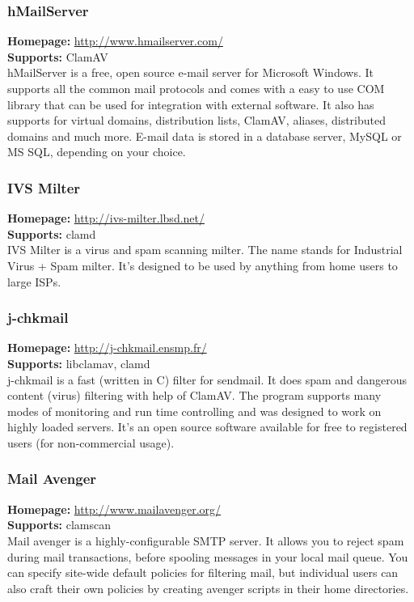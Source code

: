 \documentclass[a4paper,titlepage,12pt]{article}
\begin{document}
    \subsubsection{hMailServer}
    \textbf{Homepage:} \url{http://www.hmailserver.com/}\\
    \textbf{Supports:} ClamAV\\[4pt]
    hMailServer is a free, open source e-mail server for Microsoft Windows.
    It supports all the common mail protocols and comes with a easy to use COM
    library that can be used for integration with external software. It also
    has supports for virtual domains, distribution lists, ClamAV, aliases,
    distributed domains and much more. E-mail data is stored in a database
    server, MySQL or MS SQL, depending on your choice.

    \subsubsection{IVS Milter}
    \textbf{Homepage:} \url{http://ivs-milter.lbsd.net/}\\
    \textbf{Supports:} clamd\\[4pt]
    IVS Milter is a virus and spam scanning milter. The name stands for
    Industrial Virus + Spam milter. It's designed to be used by anything
    from home users to large ISPs.

    \subsubsection{j-chkmail}
    \textbf{Homepage:} \url{http://j-chkmail.ensmp.fr/}\\
    \textbf{Supports:} libclamav, clamd\\[4pt]
    j-chkmail is a fast (written in C) filter for sendmail. It does spam and 
    dangerous content (virus) filtering with help of ClamAV. The program
    supports many modes of monitoring and run time controlling and
    was designed to work on highly loaded servers. It's an open source
    software available for free to registered users (for non-commercial usage).

    \subsubsection{Mail Avenger}
    \textbf{Homepage:} \url{http://www.mailavenger.org/}\\
    \textbf{Supports:} clamscan\\[4pt]
    Mail avenger is a highly-configurable SMTP server. It allows you to reject
    spam during mail transactions, before spooling messages in your local mail
    queue. You can specify site-wide default policies for filtering mail, but
    individual users can also craft their own policies by creating avenger
    scripts in their home directories.
\end{document}
